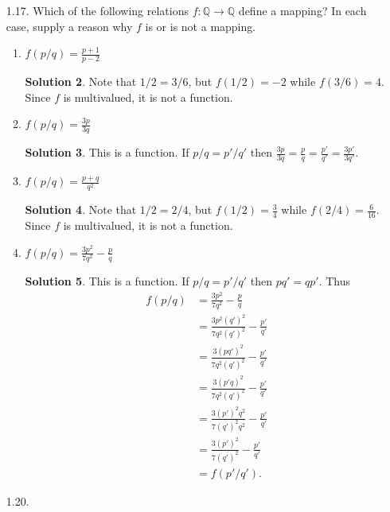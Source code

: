 \documentclass{article}
\newcommand{\QQ}{\mathbb{Q}}
\theoremstyle{definition}
\newtheorem*{solution}{Solution}
\begin{document}
\begin{enumerate}
\begin{solution}
Conversely, suppose $x \in (A \cup B) \cap (A \cup C)$.  If $x \in A,$ then $x \in A \cup (B \cap C)$.  Alternatively, if $x \not\in A$ then $x$ must be in $B$ and in $C$ since $x \in (A \cup B)$ and $x \in (A \cup C)$.  Thus $x \in (B \cap C)$.  Therefore $(A \cup B) \cap (A \cup C) \subseteq A \cup (B \cap C)$.  With both inclusions proven, we get $(A \cup B) \cap (A \cup C) = A \cup (B \cap C)$. \qed
\end{solution}
\item[1.17.] Which of the following relations $f : \QQ \to \QQ$ define a mapping?  In each case, supply a reason why $f$ is or is not a mapping.
\begin{enumerate}
\item $f(p/q) = \frac{p+1}{p-2}$
\begin{solution}
Note that $1/2 = 3/6$, but $f(1/2) = -2$ while $f(3/6) = 4$.  Since $f$ is multivalued, it is not a function.
\end{solution}
\item $f(p/q) = \frac{3p}{3q}$
\begin{solution}
This is a function.  If $p/q = p'/q'$ then $\frac{3p}{3q} = \frac{p}{q} = \frac{p'}{q'} = \frac{3p'}{3q'}$.
\end{solution}
\item $f(p/q) = \frac{p+q}{q^2}$
\begin{solution}
Note that $1/2 = 2/4$, but $f(1/2) = \frac{3}{4}$ while $f(2/4) = \frac{6}{16}$.  Since $f$ is multivalued, it is not a function.
\end{solution}
\item $f(p/q) = \frac{3p^2}{7q^2} - \frac{p}{q}$
\begin{solution}
This is a function.  If $p/q = p'/q'$ then $pq' = qp'$.  Thus
\begin{align*}
f(p/q) &= \frac{3p^2}{7q^2} - \frac{p}{q} \\
&= \frac{3p^2(q')^2}{7q^2(q')^2} - \frac{p'}{q'} \\
&= \frac{3(pq')^2}{7q^2(q')^2} - \frac{p'}{q'} \\
&= \frac{3(p'q)^2}{7q^2(q')^2} - \frac{p'}{q'} \\
&= \frac{3(p')^2q^2}{7(q')^2q^2} - \frac{p'}{q'} \\
&= \frac{3(p')^2}{7(q')^2} - \frac{p'}{q'} \\
&= f(p'/q').
\end{align*}
\end{solution}
\end{enumerate}
\item[1.20.]

\end{enumerate}
\end{document}
